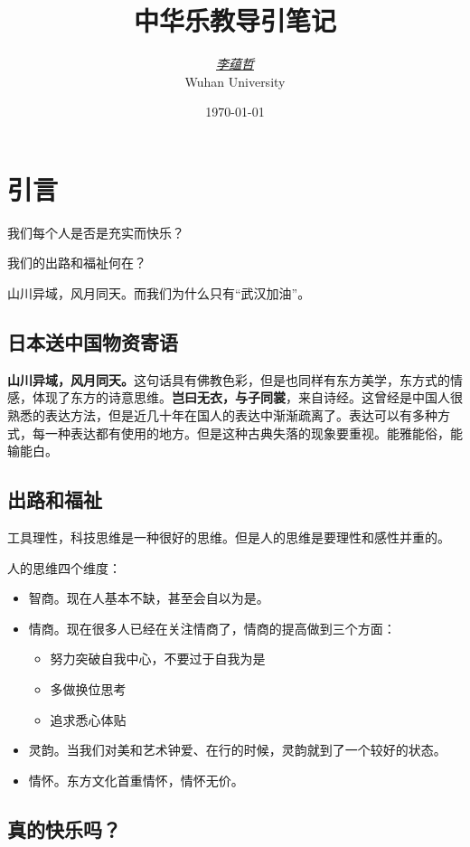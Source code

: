 \documentclass[blue,iPad,cn]{elegantnote}
\title{\bfseries 中华乐教导引笔记}
\author{\href{www.liyunzhe.cn}{\itshape 李蕴哲} \\
		Wuhan University}	%
\date{\today}
\begin{document}
{\color{ecolor}{\maketitle}}

\section{引言}

我们每个人是否是充实而快乐？

我们的出路和福祉何在？

山川异域，风月同天。而我们为什么只有“武汉加油”。

\subsection{日本送中国物资寄语}

\textbf{山川异域，风月同天。}这句话具有佛教色彩，但是也同样有东方美学，东方式的情感，体现了东方的诗意思维。\textbf{岂曰无衣，与子同裳}，来自诗经。这曾经是中国人很熟悉的表达方法，但是近几十年在国人的表达中渐渐疏离了。表达可以有多种方式，每一种表达都有使用的地方。但是这种古典失落的现象要重视。能雅能俗，能输能白。

\subsection{出路和福祉}

工具理性，科技思维是一种很好的思维。但是人的思维是要理性和感性并重的。

人的思维四个维度：

\begin{itemize}
	\item 智商。现在人基本不缺，甚至会自以为是。
	\item 情商。现在很多人已经在关注情商了，情商的提高做到三个方面：
	\begin{itemize}
		\item 努力突破自我中心，不要过于自我为是
		\item 多做换位思考
		\item 追求悉心体贴
	\end{itemize}
	\item 灵韵。当我们对美和艺术钟爱、在行的时候，灵韵就到了一个较好的状态。
	\item 情怀。东方文化首重情怀，情怀无价。
\end{itemize}

\subsection{真的快乐吗？}
\end{document}
